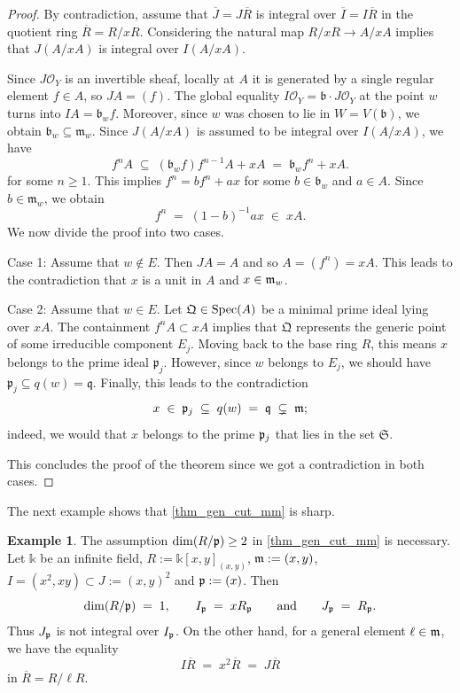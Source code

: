 \documentclass[a4paper, 11pt]{amsart}
\newcommand{\kk}{\mathbb{k}}
\newcommand{\mm}{{\normalfont\mathfrak{m}}}
\newcommand{\pp}{{\normalfont\mathfrak{p}}}
\newcommand{\qqq}{\normalfont\mathfrak{q}}
\newcommand{\Spec}{\normalfont\text{Spec}}
\theoremstyle{definition}
\newtheorem{example}[example]{Example}
\begin{document}
\begin{proof}
		By contradiction, assume that $\overline{J} = J \overline{R}$ is integral over $\overline{I} = I \overline{R}$ in the quotient ring $\overline{R}=R/xR$. 
		Considering the natural map $R/xR \rightarrow A/xA$ implies that $J(A/xA)$ is integral over $I(A/xA)$.
		
		Since $J\mathscr{O}_Y$ is an invertible sheaf, locally at $A$ it is generated by a single regular element $f \in A$, so $J A = (f)$. 
		The global equality $	I\mathscr{O}_Y =  \mathfrak{b} \cdot J\mathscr{O}_Y$ at the point $w$ turns into $I A = \mathfrak{b}_w f$. 
		Moreover, since $w$ was chosen to lie in $W = V(\mathfrak{b})$, we obtain $\mathfrak{b}_w \subseteq \mathfrak{m}_w$.
		Since $J(A/xA)$ is assumed to be integral over $I(A/xA)$, we have 
		$$
		f^n A \;\subseteq\; (\mathfrak{b}_w f) f^{n-1} A + xA \;=\; \mathfrak{b}_w f^n + xA.
		$$
		for some $n \ge 1$.
		This  implies $f^n = b f^n + ax $ for some $b \in \mathfrak{b}_w$ and $a \in A$. 
		Since $b \in \mathfrak{m}_w$, we obtain
		$$
		f^n \;=\; (1-b)^{-1}ax \;\in\; x A.
		$$
		We now divide the proof into two cases. 
		
		
		{\sc Case 1:}
		Assume that $w \notin E$.
		Then $J A = A$  and so $A = (f^n) = xA$.
		This leads to the contradiction that $x$ is a unit in $A$ and $x \in \mm_w$.
		
		{\sc Case 2:}
		Assume that $w \in E$.
		Let $\mathfrak{Q} \in \Spec(A)$ be a minimal prime ideal lying over $xA$.
		The containment $f^nA \subset xA$ implies that $\mathfrak{Q}$ represents the generic point of some irreducible component $E_j$.
		Moving back to the base ring $R$, this means $x$ belongs to the prime ideal $\mathfrak{p}_j$. 
		However, since $w$ belongs to $E_j$, we should have $\mathfrak{p}_j \subseteq q(w) = \mathfrak{q}$.
		Finally, this leads to the contradiction
		$$
		x \;\in\; \pp_j \;\subseteq \; q(w) \;=\; \qqq \;\subsetneq\; \mm;
		$$
		indeed, we would  that $x$ belongs to the prime $\pp_j$ that lies in the set $\mathfrak{S}$.
		
		This concludes the proof of the theorem since we got a contradiction in both cases. 
	\end{proof}
	
	
	The next example shows that \autoref{thm_gen_cut_mm} is sharp.
	
	\begin{example}
		The assumption $\dim(R/\pp)\geq2$ in \autoref{thm_gen_cut_mm} is necessary.
		Let $\kk$ be an infinite field, $R:=\kk[x,y]_{(x,y)}$, $\mm:=(x,y)$, $
		I=(x^2,xy) \subset J:=(x,y)^2$ and $\pp:=(x)$.
		Then 
		$$
		\dim(R/\pp) \;=\;1, \qquad 
		I_\pp \;=\; xR_\pp\qquad\text{and}\qquad J_\pp \;=\; R_\pp.
		$$
		Thus $J_\pp$ is not integral over $I_\pp$.
		On the other hand, for a general element $\ell\in\mm$, we have the equality
		$$
		I \overline{R} \;=\; x^2\overline{R}
		\;=\; J\overline{R}
		$$
		in $\overline{R} = R/\ell R$.
	\end{example}
	
\end{document}
